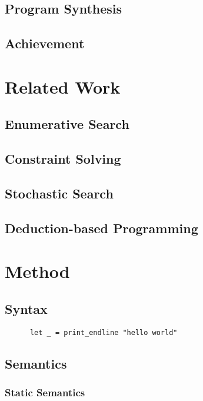 \documentclass[12pt, a4paper, titlepage]{report}
\begin{document}
  \section{Program Synthesis}
    \cite{gulwani:2017}
  \section{Achievement} %

\chapter{Related Work}\label{section:relatedWork}
  \section{Enumerative Search}
  \section{Constraint Solving}
  \section{Stochastic Search}
  \section{Deduction-based Programming}

\chapter{Method}\label{section:method}
  \section{Syntax}
    \begin{verbatim}
      let _ = print_endline "hello world"
    \end{verbatim}
  \section{Semantics}
    \subsection{Static Semantics} %
\end{document}
